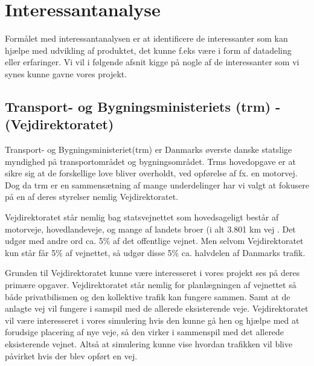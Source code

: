 \chapter{Interessantanalyse}\label{Interessentanalyse}

Formålet med interessantanalysen er at identificere de interessanter som kan hjælpe med udvikling af produktet, det kunne f.eks være i form af datadeling eller erfaringer. Vi vil i følgende afsnit kigge på nogle af de interessanter som vi synes kunne gavne vores projekt. 

\vspace{5mm}

\section{Transport- og Bygningsministeriets (trm) - (Vejdirektoratet)}
\label{sec:Trm}
Transport- og Bygningsministeriet(trm) er Danmarks øverste danske statslige myndighed på transportområdet og bygningsområdet. Trms hovedopgave er at sikre sig at de forskellige love bliver overholdt, ved opførelse af fx. en motorvej. Dog da trm er en sammensætning af mange underdelinger har vi valgt at fokusere på en af deres styrelser nemlig Vejdirektoratet.
 
\vspace{5mm}

Vejdirektoratet står nemlig bag statsvejnettet som hovedsageligt består af motorveje, hovedlandeveje, og mange af landets broer (i alt 3.801 km vej \cite{Vejdirektoratet}. Det udgør med andre ord ca. 5\% af det offentlige vejnet. Men selvom Vejdirektoratet kun står får 5\% af vejnettet, så udgør disse 5\% ca. halvdelen af Danmarks trafik.

\vspace{5mm}

Grunden til Vejdirektoratet kunne være interesseret i vores projekt ses på deres primære opgaver. Vejdirektoratet står nemlig for planlægningen af vejnettet så både privatbilismen og den kollektive trafik kan fungere sammen. Samt at de anlagte vej vil fungere i samspil med de allerede eksisterende veje.
Vejdirektoratet vil være interesseret i vores simulering hvis den kunne gå hen og hjælpe med at forudsige placering af nye veje, så den virker i sammenspil med det allerede eksisterende vejnet. Altså at simulering kunne vise hvordan trafikken vil blive påvirket hvis der blev opført en vej.

\vspace{5mm}

